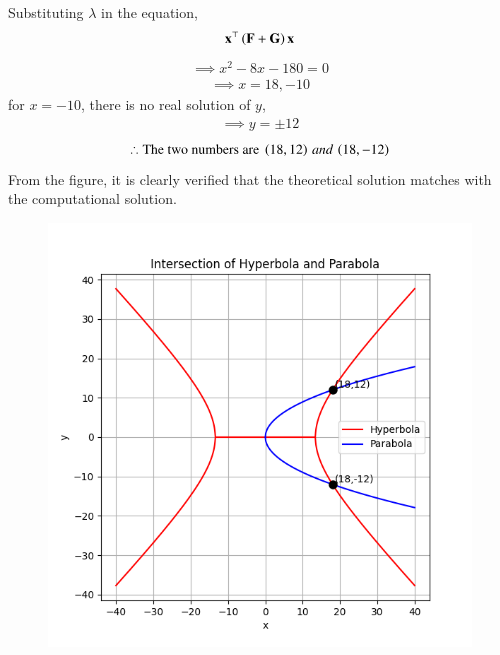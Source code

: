 \documentclass[journal]{IEEEtran}
\begin{document}
\newpage
\vspace*{0.25cm}
Substituting $\lambda$ in the equation,
\begin{align}
    \mathbf{x}^{\top}\left(\mathbf{F}+\mathbf{G}\right)\mathbf{x}
\end{align}
\begin{align}
    \implies x^2-8x-180=0
\end{align}
\begin{align}
    \implies x=18,-10
\end{align}
for $x=-10$, there is no real solution of $y$,
\begin{align}
    \implies y=\pm 12
\end{align}
\begin{align}
    \therefore \text{The two numbers are }\left(18,12\right)\, and\, \left(18,-12\right)
\end{align}
From the figure, it is clearly verified that the theoretical solution matches with the computational solution.\\
\begin{figure}[H]
    \centering
    \includegraphics[width=0.8\columnwidth]{figs/Figure_1.png}
    \label{fig:1}
\end{figure}
\end{document}
